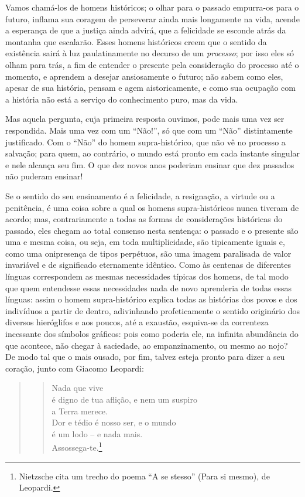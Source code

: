 Vamos chamá-los de homens históricos; o olhar para o passado empurra-os
para o futuro, inflama sua coragem de perseverar ainda mais longamente
na vida, acende a esperança de que a justiça ainda advirá, que a
felicidade se esconde atrás da montanha que escalarão. Esses homens
históricos creem que o sentido da existência sairá à luz paulatinamente
no decurso de um \emph{processo}; por isso eles só olham para trás, a
fim de entender o presente pela consideração do processo até o momento,
e aprendem a desejar ansiosamente o futuro; não sabem como eles, apesar
de sua história, pensam e agem aistoricamente, e como sua ocupação com a
história não está a serviço do conhecimento puro, mas da vida.

Mas aquela pergunta, cuja primeira resposta ouvimos, pode mais uma vez
ser respondida. Mais uma vez com um ``Não!'', só que com um ``Não''
distintamente justificado. Com o ``Não'' do homem supra-histórico, que não
vê no processo a salvação; para quem, ao contrário, o mundo está pronto
em cada instante singular e nele alcança seu fim. O que dez novos anos
poderiam ensinar que dez passados não puderam ensinar!

Se o sentido do seu ensinamento é a felicidade, a resignação, a virtude
ou a penitência, é uma coisa sobre a qual os homens supra-históricos
nunca tiveram de acordo; mas, contrariamente a todas as formas de
considerações históricas do passado, eles chegam ao total consenso nesta
sentença: o passado e o presente são uma e mesma coisa, ou seja, em toda
multiplicidade, são tipicamente iguais e, como uma onipresença de tipos
perpétuos, são uma imagem paralisada de valor invariável e de
significado eternamente idêntico.\label{eternamenteidentico} Como às centenas de diferentes línguas
correspondem as mesmas necessidades típicas dos homens, de tal modo que
quem entendesse essas necessidades nada de novo aprenderia de todas
essas línguas: assim o homem supra-histórico explica todas as histórias
dos povos e dos indivíduos a partir de dentro, adivinhando
profeticamente o sentido originário dos diversos hieróglifos e aos
poucos, até a exaustão, esquiva-se da correnteza incessante dos símbolos
gráficos: pois como poderia ele, na infinita abundância do que acontece,
não chegar à saciedade, ao empanzinamento, ou mesmo ao nojo? De modo tal
que o mais ousado, por fim, talvez esteja pronto para dizer a seu coração,
junto com Giacomo Leopardi:

\begin{quote}
\begin{verse}
Nada que vive\\
é digno de tua aflição, e nem um suspiro\\
a Terra merece.\\
Dor e tédio é nosso ser, e o mundo\\
é um lodo -- e nada mais.\\
Assossega-te.\footnote{Nietzsche cita um trecho do poema ``A se
  stesso'' (Para si mesmo), de Leopardi.}
\end{verse}
\end{quote}

